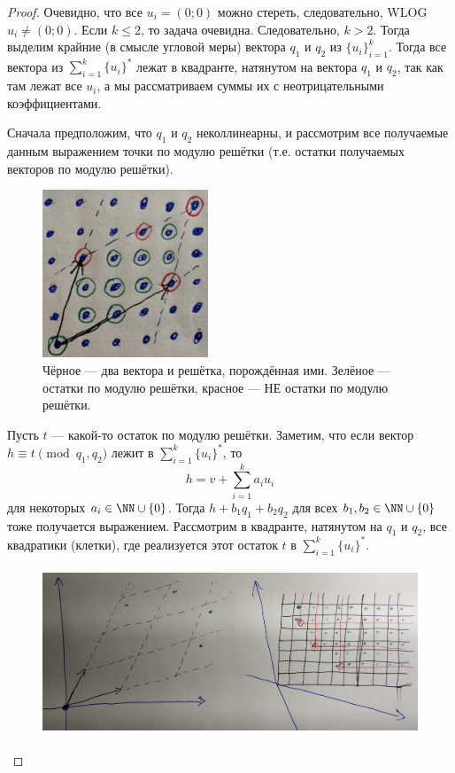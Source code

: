 \documentclass[12pt,a4paper]{article}
\begin{document}
\begin{problem}{8}
\begin{enumerate}
                \begin{proof}
                    Очевидно, что все $u_i = (0; 0)$ можно стереть, следовательно, WLOG $u_i \neq (0; 0)$. Если $k \leqslant 2$, то задача очевидна. Следовательно, $k > 2$. Тогда выделим крайние (в смысле угловой меры) вектора $q_1$ и $q_2$ из $\{u_i\}_{i=1}^k$. Тогда все вектора из $\sum_{i=1}^k \{u_i\}^*$ лежат в квадранте, натянутом на вектора $q_1$ и $q_2$, так как там лежат все $u_i$, а мы рассматриваем суммы их с неотрицательными коэффициентами.
                    
                    Сначала предположим, что $q_1$ и $q_2$ неколлинеарны, и рассмотрим все получаемые данным выражением точки по модулю решётки (т.е. остатки получаемых векторов по модулю решётки).
                    \begin{figure}[H]
                        \centering
                        \includegraphics[height=5cm]{TI-HW-006-3.jpg}
                        \caption{Чёрное --- два вектора и решётка, порождённая ими. Зелёное --- остатки по модулю решётки, красное --- НЕ остатки по модулю решётки.}
                    \end{figure}
                    Пусть $t$ --- какой-то остаток по модулю решётки. Заметим, что если вектор $h \equiv t \pmod{q_1, q_2}$ лежит в $\sum_{i=1}^k \{u_i\}^*$, то
                    \[h = v + \sum_{i=1}^k a_i u_i\]
                    для некоторых $a_i \in \NN \cup \{0\}$. Тогда $h + b_1 q_1 + b_2 q_2$ для всех $b_1, b_2 \in \NN \cup \{0\}$ тоже получается выражением. Рассмотрим в квадранте, натянутом на $q_1$ и $q_2$, все квадратики (клетки), где реализуется этот остаток $t$ в $\sum_{i=1}^k \{u_i\}^*$.
                    \begin{figure}[H]
                        \centering
                        \includegraphics[height=5cm]{TI-HW-006-4.jpg}

\end{figure}
\end{proof}
\end{enumerate}
\end{problem}
\end{document}
